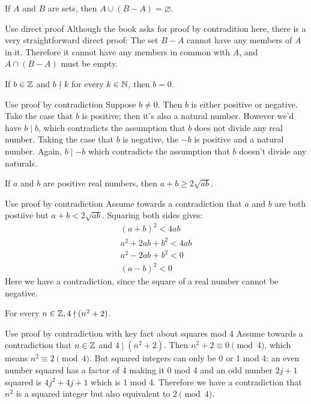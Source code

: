 \documentclass{article}
\begin{document}
\begin{problem}
If $A$ and $B$ are sets, then $A \cup (B - A) = \varnothing$.
\end{problem}
\begin{solution}{Use direct proof}
  Although the book asks for proof by contradition here, there is a very straightforward direct proof:
  The set $B - A$ cannot have any members of $A$ in it. Therefore it cannot have any members in common with $A$, and $A \cap (B - A)$ must be empty.
\end{solution}

\begin{problem}
If $b \in \mathbb{Z}$ and $b \nmid k$ for every $k \in \mathbb{N}$, then $b = 0$.
\end{problem}
\begin{solution}{Use proof by contradiction}
  Suppose $b\neq 0$. Then $b$ is either positive or negative. Take the case that $b$ is positive; then it's also a natural number. However we'd have $b \mid b$, which contradicts the assumption that $b$ does not divide any real number. Taking the case that $b$ is negative, the $-b$ is positive and a natural number. Again, $b \mid -b$ which contradicts the assumption that $b$ doesn't divide any naturals.
\end{solution}

\begin{problem}
If $a$ and $b$ are positive real numbers, then $a + b \geq 2\sqrt{ab}$.
\end{problem}
\begin{solution}{Use proof by contradiction}
  Assume towards a contradiction that $a$ and $b$ are both postiive but $a + b < 2\sqrt{ab}$. Squaring both sides gives:
  \begin{align*}
    (a + b)^2 < 4ab       \\
    a^2 + 2ab + b^2 < 4ab \\
    a^2 - 2ab + b^2 < 0   \\
    (a - b)^2 < 0
  \end{align*}
  Here we have a contradiction, since the square of a real number cannot be negative.
\end{solution}

\begin{problem}
For every $n \in \mathbb{Z}, 4 \nmid (n^2 + 2)$.
\end{problem}
\begin{solution}{Use proof by contradiction with key fact about squares mod 4}
  Assume towards a contradiction that $n \in \mathbb{Z}$ and $4 \mid (n^2 + 2)$. Then $n^2 + 2 \equiv 0 \pmod{4}$, which means $n^2 \equiv 2 \pmod{4}$. But squared integers can only be 0 or 1 mod 4: an even number squared has a factor of 4 making it 0 mod 4 and an odd number $2j + 1$ squared is $4j^2 + 4j + 1$ which is 1 mod 4. Therefore we have a contradiction that $n^2$ is a squared integer but also equivalent to $2 \pmod{4}$.
\end{solution}
\end{document}
